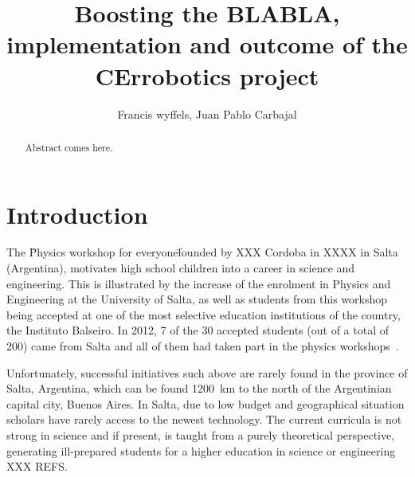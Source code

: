 \documentclass[a4paper]{llncs}
\begin{document}
\linespread{0.965}\selectfont

\mainmatter  %

\title{Boosting the BLABLA, implementation and outcome of the CErrobotics project}

%
%
\author{Francis wyffels, Juan Pablo Carbajal}
%


\maketitle

\begin{abstract}
Abstract comes here.

\end{abstract}

\section{Introduction}
 The \"Physics workshop for everyone\" founded by XXX Cordoba in XXXX in Salta (Argentina), motivates high school children into a career in science and engineering. This is illustrated by the increase of the enrolment in Physics and Engineering at the University of Salta, as well as students from this workshop being accepted at one of the most selective education institutions of the country, the Instituto Balseiro. In 2012, 7 of the 30 accepted students (out of a total of 200) came from Salta and all of them had taken part in the physics workshops~\cite{salta2012}.

Unfortunately, successful initiatives such above are rarely found in the province of Salta, Argentina, which can be found 1200~km to the north of the Argentinian capital city, Buenos Aires. In Salta, due to low budget and geographical situation scholars have rarely access to the newest technology. The current curricula is not strong in science and if present, is taught from a purely theoretical perspective, generating ill-prepared students for a higher education in science or engineering XXX REFS.
\end{document}
